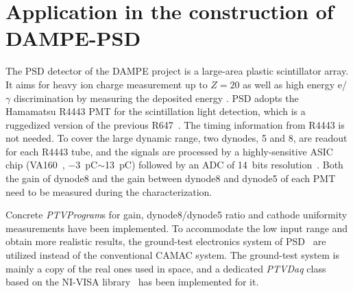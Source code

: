 \documentclass{nst}
\providecommand{\DIFadd}[1]{{\protect\color{yellow} #1}} %
\providecommand{\DIFaddbegin}{} %
\providecommand{\DIFaddend}{} %
\providecommand{\DIFdelbegin}{} %
\providecommand{\DIFdelend}{} %
\begin{document}
\section{Application in the construction of DAMPE-PSD}
\label{sec:application}

The PSD detector of the DAMPE project is a large-area plastic scintillator array\DIFdelbegin \DIFdelend . It aims for \DIFaddbegin \DIFadd{heavy ion charge measurement up to $Z=20$ as well as }\DIFaddend high energy e/$\gamma$ discrimination \DIFdelbegin \DIFdelend by measuring the deposited energy\DIFdelbegin \DIFdelend \DIFaddbegin \DIFadd{. PSD adopts the Hamamatsu R4443 PMT for the scintillation light detection, which is a ruggedized version of the previous R647~\cite{r4443}. The timing information from R4443 }\DIFaddend is not needed. To cover the large dynamic range, two dynodes, 5 and 8, are readout for each R4443 tube, 
and the signals are processed by a highly-sensitive ASIC chip (VA160~\cite{va160}, \SI{-3}{\pico\coulomb}$\sim$\SI{13}{\pico\coulomb}) \DIFdelbegin \DIFdelend \DIFaddbegin \DIFadd{followed by }\DIFaddend an ADC of 14~bits resolution~\cite{yanghaibo_fee}. 
Both the gain of dynode8 and the gain between dynode8 and dynode5 of each PMT need to be  measured \DIFdelbegin \DIFdelend \DIFaddbegin \DIFadd{during the characterization}\DIFaddend .

Concrete \textit{PTVProgram}s for gain, dynode8/dynode5 ratio and cathode uniformity measurements have been implemented.
To accommodate the low input range and obtain more realistic results, the ground-test electronics system of PSD~\cite{yanghaibo_fee} are utilized instead of the conventional CAMAC system. 
The ground-test system is mainly a copy of the real ones used in space, and a dedicated \textit{PTVDaq} class based on the NI-VISA library~\cite{ni_visa} has been implemented for it.

\end{document}
